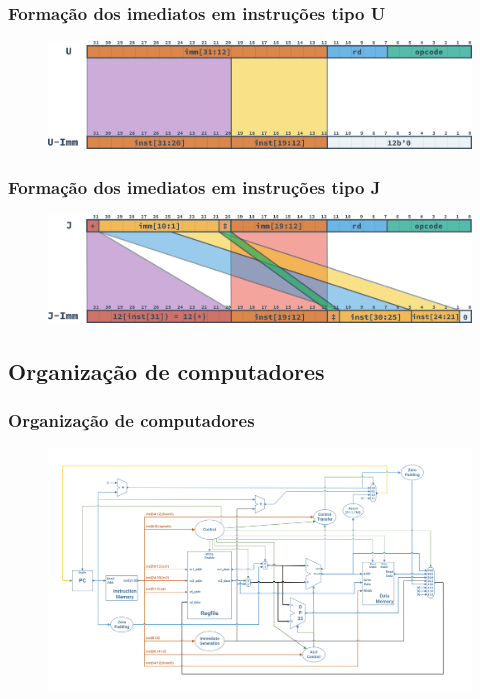 \documentclass[aspectratio=169]{beamer}
\begin{document}
    \begin{frame}
        \frametitle{Formação dos imediatos em instruções tipo \textbf{U}}
        \vfill
        \begin{figure}[H]
        \centering
            \includegraphics[width=.9\textwidth,height=.9\textheight,keepaspectratio]
            {../images/instructions/rv32_u_immediate.png}
        \end{figure}
        \vfill
    \end{frame}

    \begin{frame}
        \frametitle{Formação dos imediatos em instruções tipo \textbf{J}}
        \vfill
        \begin{figure}[H]
        \centering
            \includegraphics[width=.9\textwidth,height=.9\textheight,keepaspectratio]
            {../images/instructions/rv32_j_immediate.png}
        \end{figure}
        \vfill
    \end{frame}

    \subsection{Organização de computadores}
    \begin{frame}
        \frametitle{Organização de computadores}
        \vfill
        \begin{figure}[H]
        \centering
            \includegraphics[width=.9\textwidth,height=.9\textheight,keepaspectratio]
            {../images/singlecycle_generic.png}
        \end{figure}
        \vfill
    \end{frame}
\end{document}
